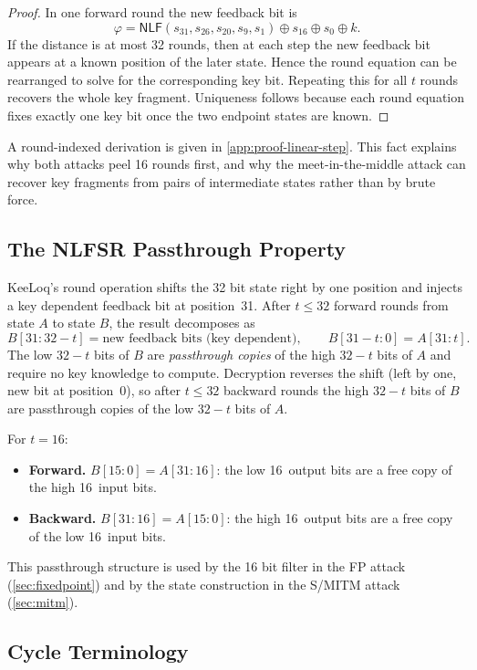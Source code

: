 \documentclass[version=preprint]{iacrcc}
\providecommand{\NLF}{\mathsf{NLF}}
\begin{document}
\begin{proof}
In one forward round the new feedback bit is
\[
\varphi = \NLF(s_{31}, s_{26}, s_{20}, s_9, s_1) \oplus s_{16} \oplus s_0 \oplus k.
\]
If the distance is at most 32 rounds, then at each step the new feedback bit appears at a known position of the later state.
Hence the round equation can be rearranged to solve for the corresponding key bit.
Repeating this for all $t$ rounds recovers the whole key fragment.
Uniqueness follows because each round equation fixes exactly one key bit once the two endpoint states are known.
\end{proof}

A round-indexed derivation is given in \autoref{app:proof-linear-step}.
This fact explains why both attacks peel 16 rounds first, and
why the meet-in-the-middle attack can recover key fragments from pairs of intermediate states rather than by brute force.

\subsection{The NLFSR Passthrough Property}\label{subsec:passthrough}

KeeLoq's round operation shifts the 32 bit state right by one position and injects a key dependent feedback bit at position~31.
After $t \leq 32$ forward rounds from state $A$ to state $B$, the result decomposes as
\[
B[31:32{-}t] = \text{new feedback bits (key dependent)},
\qquad
B[31{-}t:0] = A[31:t].
\]
The low $32-t$ bits of $B$ are \emph{passthrough copies} of the high $32-t$ bits of $A$ and require no key knowledge to compute.
Decryption reverses the shift (left by one, new bit at position~0), so after $t \leq 32$ backward rounds the high $32-t$ bits of $B$ are passthrough copies of the low $32-t$ bits of $A$.

For $t=16$:
\begin{itemize}
  \item \textbf{Forward.} $B[15:0] = A[31:16]$: the low 16~output bits are a free copy of the high 16~input bits.
  \item \textbf{Backward.} $B[31:16] = A[15:0]$: the high 16~output bits are a free copy of the low 16~input bits.
\end{itemize}
This passthrough structure is used by the 16 bit filter in the FP attack (\autoref{sec:fixedpoint}) and by the state construction in the S/MITM attack (\autoref{sec:mitm}).

\subsection{Cycle Terminology}\label{subsec:cycle-terminology}
\end{document}
